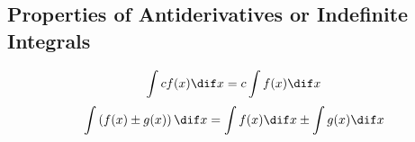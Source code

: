 \subsection{Properties of Antiderivatives or Indefinite Integrals}
	\[\int c f(x) \dif x = c \int f(x) \dif x\]
	\[\int \left( f(x) \pm g(x) \right) \dif x = \int f(x) \dif x \pm \int g(x) \dif x\]

